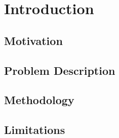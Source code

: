 \chapter{Introduction}
\label{chp:introduction} 

\section{Motivation}

\section{Problem Description}

\section{Methodology}

\section{Limitations}